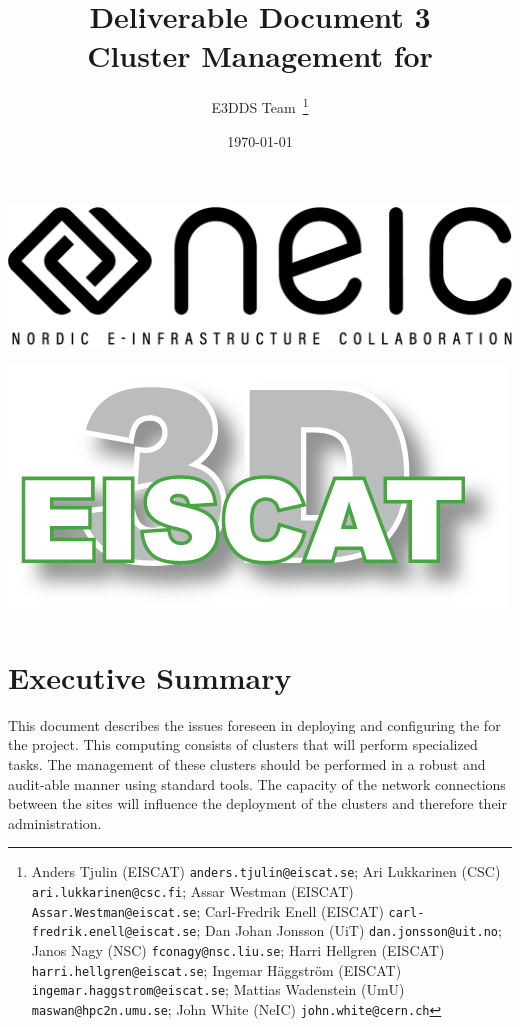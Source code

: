 \documentclass[12pt,a4paper]{article}
\title{
{\bf Deliverable Document 3} \\
Cluster Management for \ED}
\author{E3DDS Team~\footnote{
Anders Tjulin (EISCAT) {\tt anders.tjulin@eiscat.se};
Ari Lukkarinen (CSC) {\tt ari.lukkarinen@csc.fi};
Assar Westman (EISCAT) {\tt Assar.Westman@eiscat.se};
Carl-Fredrik Enell (EISCAT) {\tt carl-fredrik.enell@eiscat.se};
Dan Johan Jonsson (UiT) {\tt dan.jonsson@uit.no};
Janos Nagy (NSC) {\tt fconagy@nsc.liu.se};
Harri Hellgren (EISCAT) {\tt harri.hellgren@eiscat.se};
Ingemar H\"{a}ggstr\"{o}m (EISCAT) {\tt ingemar.haggstrom@eiscat.se};
Mattias Wadenstein (UmU) {\tt maswan@hpc2n.umu.se};
John White (NeIC) {\tt john.white@cern.ch}}}
\date{\today}
\begin{document}
\pagestyle{fancy}

\maketitle
\par\noindent
\begin{minipage}{0.5\textwidth}
  \includegraphics[scale=0.18]{NEIC_logo_screen_black.pdf}
\end{minipage}
\begin{minipage}{0.5\textwidth}
  \hfill
  \includegraphics[width=0.75\linewidth]{e3d-logo-green-500px}
\end{minipage}

\newpage
\tableofcontents
\newpage

\section{Executive Summary}
\label{exec-summ}


This document describes the issues foreseen in deploying and configuring the \einfra for the \ED project. This computing \einfra consists of clusters that will perform specialized tasks.
The management of these clusters should be performed in a robust and audit-able manner using standard tools.
The capacity of the network connections between the sites will influence the deployment of the clusters and therefore their administration.
\end{document}
